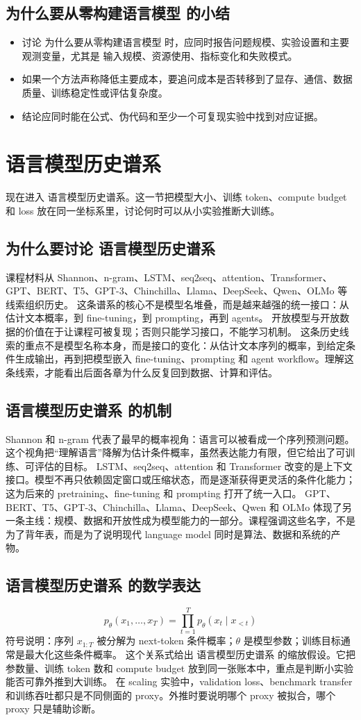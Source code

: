 \documentclass[a4paper]{article}
\begin{document}
\subsection{为什么要从零构建语言模型 的小结}
\begin{itemize}
\item 讨论 为什么要从零构建语言模型 时，应同时报告问题规模、实验设置和主要观测变量，尤其是 输入规模、资源使用、指标变化和失败模式。
\item 如果一个方法声称降低主要成本，要追问成本是否转移到了显存、通信、数据质量、训练稳定性或评估复杂度。
\item 结论应同时能在公式、伪代码和至少一个可复现实验中找到对应证据。
\end{itemize}
\section{语言模型历史谱系}
现在进入 语言模型历史谱系。这一节把模型大小、训练 token、compute budget 和 loss 放在同一坐标系里，讨论何时可以从小实验推断大训练。
\subsection{为什么要讨论 语言模型历史谱系}
课程材料从 Shannon、n-gram、LSTM、seq2seq、attention、Transformer、GPT、BERT、T5、GPT-3、Chinchilla、Llama、DeepSeek、Qwen、OLMo 等线索组织历史。
这条谱系的核心不是模型名堆叠，而是越来越强的统一接口：从估计文本概率，到 fine-tuning，到 prompting，再到 agents。
开放模型与开放数据的价值在于让课程可被复现；否则只能学习接口，不能学习机制。
这条历史线索的重点不是模型名称本身，而是接口的变化：从估计文本序列的概率，到给定条件生成输出，再到把模型嵌入 fine-tuning、prompting 和 agent workflow。理解这条线索，才能看出后面各章为什么反复回到数据、计算和评估。
\subsection{语言模型历史谱系 的机制}
Shannon 和 n-gram 代表了最早的概率视角：语言可以被看成一个序列预测问题。这个视角把“理解语言”降解为估计条件概率，虽然表达能力有限，但它给出了可训练、可评估的目标。
LSTM、seq2seq、attention 和 Transformer 改变的是上下文接口。模型不再只依赖固定窗口或压缩状态，而是逐渐获得更灵活的条件化能力；这为后来的 pretraining、fine-tuning 和 prompting 打开了统一入口。
GPT、BERT、T5、GPT-3、Chinchilla、Llama、DeepSeek、Qwen 和 OLMo 体现了另一条主线：规模、数据和开放性成为模型能力的一部分。课程强调这些名字，不是为了背年表，而是为了说明现代 language model 同时是算法、数据和系统的产物。
\subsection{语言模型历史谱系 的数学表达}
\[p_\theta(x_1,\ldots,x_T)=\prod_{t=1}^{T}p_\theta(x_t\mid x_{<t})\]
符号说明：序列 \(x_{1:T}\) 被分解为 next-token 条件概率；\(\theta\) 是模型参数；训练目标通常是最大化这些条件概率。
这个关系式给出 语言模型历史谱系 的缩放假设。它把参数量、训练 token 数和 compute budget 放到同一张账本中，重点是判断小实验能否可靠外推到大训练。
在 scaling 实验中，validation loss、benchmark transfer 和训练吞吐都只是不同侧面的 proxy。外推时要说明哪个 proxy 被拟合，哪个 proxy 只是辅助诊断。
\end{document}
